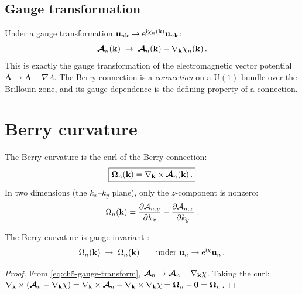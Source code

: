 \subsection{Gauge transformation}
\label{sec:ch5-gauge}

Under a gauge transformation
$\mathbf{u}_{n\mathbf{k}}\to\mathrm{e}^{\mathrm{i}\chi_n(\mathbf{k})}\mathbf{u}_{n\mathbf{k}}$:
\begin{equation}\label{eq:ch5-gauge-transform}
  \boldsymbol{\mathcal{A}}_n(\mathbf{k}) \;\to\;
  \boldsymbol{\mathcal{A}}_n(\mathbf{k}) - \nabla_{\mathbf{k}}\chi_n(\mathbf{k})\,.
\end{equation}
This is exactly the gauge transformation of the electromagnetic vector
potential $\mathbf{A}\to\mathbf{A}-\nabla\Lambda$.  The Berry
connection is a \emph{connection} on a $\mathrm{U}(1)$ bundle over the
Brillouin zone, and its gauge dependence is the defining property of a
connection.

\section{Berry curvature}
\label{sec:ch5-curvature}

\begin{definition}
  \label{def:ch5-berry-curvature}
  The Berry curvature is the curl of the Berry connection:
  \begin{equation}\label{eq:ch5-berry-curvature}
    \boxed{%
    \Fberryvec_n(\kvec) = \nabla_\kvec\times\Aberryvec_n(\kvec)\,.}
  \end{equation}
  In two dimensions (the $k_x$--$k_y$ plane), only the $z$-component
  is nonzero:
  \begin{equation}\label{eq:ch5-curvature-2d}
    \Omega_n(\mathbf{k})
    = \frac{\partial \mathcal{A}_{n,y}}{\partial k_x} - \frac{\partial \mathcal{A}_{n,x}}{\partial k_y}\,.
  \end{equation}
\end{definition}

\begin{proposition}
  The Berry curvature is gauge-invariant \cite{raman2010photonic}:
  \begin{equation}
    \Omega_n(\mathbf{k}) \;\to\; \Omega_n(\mathbf{k})
    \qquad\text{under }
    \mathbf{u}_n\to\mathrm{e}^{\mathrm{i}\chi}\mathbf{u}_n\,.
  \end{equation}
\end{proposition}

\begin{proof}
From \eqref{eq:ch5-gauge-transform},
$\boldsymbol{\mathcal{A}}_n\to\boldsymbol{\mathcal{A}}_n-\nabla_{\mathbf{k}}\chi$.  Taking the curl:
$\nabla_{\mathbf{k}}\times(\boldsymbol{\mathcal{A}}_n-\nabla_{\mathbf{k}}\chi)
=\nabla_{\mathbf{k}}\times\boldsymbol{\mathcal{A}}_n-\nabla_{\mathbf{k}}\times\nabla_{\mathbf{k}}\chi
=\boldsymbol{\Omega}_n-\mathbf{0}=\boldsymbol{\Omega}_n$.
\end{proof}

